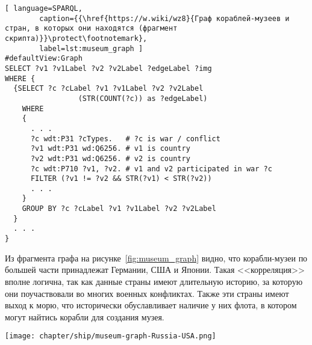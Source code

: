 \begin{lstlisting}[ language=SPARQL, 
        caption={{\href{https://w.wiki/wz8}{Граф кораблей-музеев и стран, в которых они находятся (фрагмент скрипта)}}\protect\footnotemark}, 
        label=lst:museum_graph ]
#defaultView:Graph
SELECT ?v1 ?v1Label ?v2 ?v2Label ?edgeLabel ?img
WHERE {
  {SELECT ?c ?cLabel ?v1 ?v1Label ?v2 ?v2Label 
                 (STR(COUNT(?c)) as ?edgeLabel) 
    WHERE
    {
      . . .
      ?c wdt:P31 ?cTypes.   # ?c is war / conflict
      ?v1 wdt:P31 wd:Q6256. # v1 is country
      ?v2 wdt:P31 wd:Q6256. # v2 is country
      ?c wdt:P710 ?v1, ?v2. # v1 and v2 participated in war ?c
      FILTER (?v1 != ?v2 && STR(?v1) < STR(?v2)) 
      . . .
    }
    GROUP BY ?c ?cLabel ?v1 ?v1Label ?v2 ?v2Label
  }
  . . .
}
\end{lstlisting}

Из фрагмента графа на рисунке~\ref{fig:museum_graph} видно, 
что корабли-музеи по большей части принадлежат Германии, США и Японии. 
Такая <<корреляция>> вполне логична, так как данные страны имеют длительную историю, 
за которую они поучаствовали во многих военных конфликтах. 
Также эти страны имеют выход к морю, что исторически обуславливает наличие у них флота, 
в котором могут найтись корабли для создания музея.

\begin{figure*}[h]
  \texttt{[image: chapter/ship/museum-graph-Russia-USA.png]}
  \caption[Граф стран и кораблей-музеев]{Фрагмент графа стран, участвовавших в войнах. Фрагмент включает ряд кораблей-музеев России и США. Граф построен по скрипту~\protect\ref{lst:museum_graph}.}%
  \label{fig:museum_graph}%
\end{figure*}

